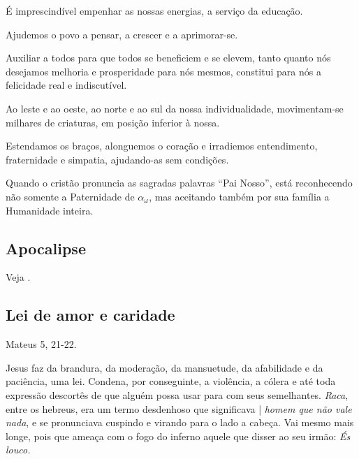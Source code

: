 \documentclass[12pt,a4paper]{article}
\begin{document}
			\'E imprescind\'ivel empenhar as nossas energias, a servi\c{c}o da educa\c{c}\~ao.

			Ajudemos o povo a pensar, a crescer e a aprimorar-se\cite{aperfeicoamento}.

			Auxiliar a todos para que todos se beneficiem e se elevem, tanto quanto n\'os desejamos melhoria e prosperidade para n\'os mesmos, constitui para n\'os a felicidade real e indiscut\'ivel.

			Ao leste e ao oeste, ao norte e ao sul da nossa individualidade, movimentam-se milhares de criaturas, em posi\c{c}\~ao inferior \`a nossa.

			Estendamos os bra\c{c}os, alonguemos o cora\c{c}\~ao e irradiemos entendimento, fraternidade e simpatia, ajudando-as sem condi\c{c}\~oes.

			Quando o crist\~ao pronuncia as sagradas palavras \textquotedblleft Pai Nosso\textquotedblright, est\'a reconhecendo n\~ao somente a Paternidade de $ \alpha_\omega $, mas aceitando tamb\'em por sua fam\'ilia a Humanidade inteira.

		\subsection{Apocalipse}
			\begin{flushright}
			\end{flushright}

			Veja \cite{apocalipse}.

		\subsection{Lei de amor e caridade}
			\begin{flushright}
			\end{flushright}

			Mateus\cite{palavrasAtiradas} 5, 21-22.

			Jesus faz da brandura, da modera\c{c}\~ao, da mansuetude, da afabilidade e da paci\^encia, uma lei. Condena, por conseguinte, a viol\^encia, a c\'olera e at\'e toda express\~ao descort\^es de que algu\'em possa usar para com seus semelhantes. \emph{Raca}, entre os hebreus, era um termo desdenhoso que significava | \emph{homem que n\~ao vale nada}, e se pronunciava cuspindo e virando para o lado a cabe\c{c}a. Vai mesmo mais longe, pois que amea\c{c}a com o fogo do inferno\cite{demonismo} aquele que disser ao seu irm\~ao: \emph{\'Es louco\cite{mistificacao}.}
\end{document}

